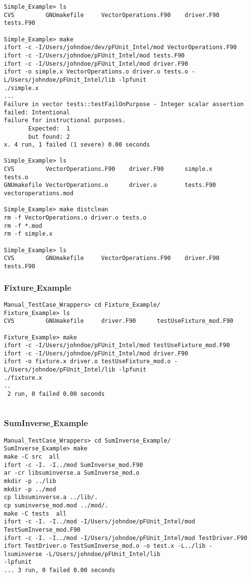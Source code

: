 \documentclass[10pt]{article}
\begin{document}
{\small \begin{verbatim}
Simple_Example> ls
CVS			GNUmakefile		VectorOperations.F90	driver.F90		tests.F90

Simple_Example> make
ifort -c -I/Users/johndoe/dev/pFUnit_Intel/mod VectorOperations.F90
ifort -c -I/Users/johndoe/pFUnit_Intel/mod tests.F90
ifort -c -I/Users/johndoe/pFUnit_Intel/mod driver.F90
ifort -o simple.x VectorOperations.o driver.o tests.o -L/Users/johndoe/pFUnit_Intel/lib -lpfunit
./simple.x
...  
Failure in vector tests::testFailOnPurpose - Integer scalar assertion failed: Intentional 
failure for instructional purposes.
       Expected:  1
       but found: 2
x. 4 run, 1 failed (1 severe) 0.00 seconds

Simple_Example> ls
CVS			VectorOperations.F90	driver.F90		simple.x		tests.o
GNUmakefile	VectorOperations.o		driver.o		tests.F90		vectoroperations.mod

Simple_Example> make distclean
rm -f VectorOperations.o driver.o tests.o
rm -f *.mod
rm -f simple.x

Simple_Example> ls
CVS			GNUmakefile		VectorOperations.F90	driver.F90		tests.F90
\end{verbatim}
}


\subsubsection{Fixture\underline{ }Example}

{\small \begin{verbatim}
Manual_TestCase_Wrappers> cd Fixture_Example/
Fixture_Example> ls
CVS			GNUmakefile		driver.F90		testUseFixture_mod.F90

Fixture_Example> make
ifort -c -I/Users/johndoe/pFUnit_Intel/mod testUseFixture_mod.F90
ifort -c -I/Users/johndoe/pFUnit_Intel/mod driver.F90
ifort -o fixture.x driver.o testUseFixture_mod.o -L/Users/johndoe/pFUnit_Intel/lib -lpfunit
./fixture.x
..  
 2 run, 0 failed 0.00 seconds
 
\end{verbatim}
}

\subsubsection{SumInverse\underline{ }Example}

{\small \begin{verbatim}
Manual_TestCase_Wrappers> cd SumInverse_Example/
SumInverse_Example> make
make -C src  all
ifort -c -I. -I../mod SumInverse_mod.F90 
ar -cr libsuminverse.a SumInverse_mod.o
mkdir -p ../lib
mkdir -p ../mod
cp libsuminverse.a ../lib/.
cp suminverse_mod.mod ../mod/.
make -C tests  all
ifort -c -I. -I../mod -I/Users/johndoe/pFUnit_Intel/mod TestSumInverse_mod.F90 
ifort -c -I. -I../mod -I/Users/johndoe/pFUnit_Intel/mod TestDriver.F90 
ifort TestDriver.o TestSumInverse_mod.o -o test.x -L../lib -lsuminverse -L/Users/johndoe/pFUnit_Intel/lib 
-lpfunit
... 3 run, 0 failed 0.00 seconds

\end{verbatim}
}
\end{document}
